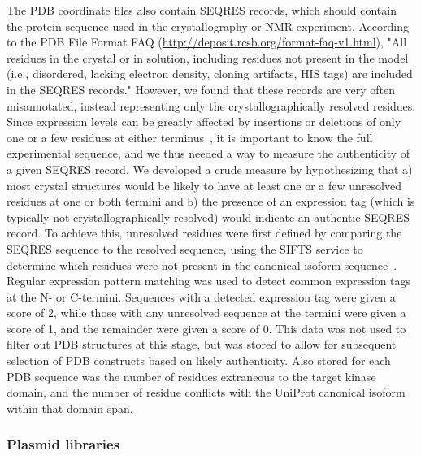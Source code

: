 \documentclass[9pt,lineno]{elife}
\begin{document}
The PDB coordinate files also contain SEQRES records, which should contain the protein sequence used in the crystallography or NMR experiment.
According to the PDB File Format FAQ (\url{http://deposit.rcsb.org/format-faq-v1.html}), "All residues in the crystal or in solution, including residues not present in the model (i.e., disordered, lacking electron density, cloning artifacts, HIS tags) are included in the SEQRES records."
However, we found that these records are very often misannotated, instead representing only the crystallographically resolved residues.
Since expression levels can be greatly affected by insertions or deletions of only one or a few residues at either terminus~\citep{klock_combining_2008}, it is important to know the full experimental sequence, and we thus needed a way to measure the authenticity of a given SEQRES record.
We developed a crude measure by hypothesizing that a) most crystal structures would be likely to have at least one or a few unresolved residues at one or both termini and b) the presence of an expression tag (which is typically not crystallographically resolved) would indicate an authentic SEQRES record.
To achieve this, unresolved residues were first defined by comparing the SEQRES sequence to the resolved sequence, using the SIFTS service to determine which residues were not present in the canonical isoform sequence~\citep{doi:10.1093/nar/gks1258}.
Regular expression pattern matching was used to detect common expression tags at the N- or C-termini.
Sequences with a detected expression tag were given a score of 2, while those with any unresolved sequence at the termini were given a score of 1, and the remainder were given a score of 0.
This data was not used to filter out PDB structures at this stage, but was stored to allow for subsequent selection of PDB constructs based on likely authenticity.
Also stored for each PDB sequence was the number of residues extraneous to the target kinase domain, and the number of residue conflicts with the UniProt canonical isoform within that domain span.

\subsubsection{Plasmid libraries}
\end{document}
